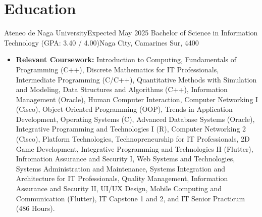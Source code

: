 \section{Education}

\resumeSubHeadingListStart
    \resumeSubheading
    {Ateneo de Naga University}{Expected May 2025}
    {Bachelor of Science in Information Technology (GPA: 3.40 / 4.00)}{Naga City, Camarines Sur, 4400}
    \begin{itemize}
        \item[] \textbf{Relevant Coursework:} Introduction to Computing, Fundamentals of Programming (C++), Discrete Mathematics for IT Professionals, Intermediate Programming (C/C++), Quantitative Methods with Simulation and Modeling, Data Structures and Algorithms (C++), Information Management (Oracle), Human Computer Interaction, Computer Networking I (Cisco), Object-Oriented Programming (OOP), Trends in Application Development, Operating Systems (C), Advanced Database Systems (Oracle), Integrative Programming and Technologies I (R), Computer Networking 2 (Cisco), Platform Technologies, Technopreneurship for IT Professionals, 2D Game Development, Integrative Programming and Technologies II (Flutter), Infromation Assurance and Security I, Web Systems and Technologies, Systems Administration and Maintenance, Systems Integration and Architecture for IT Professionals, Quality Management, Information Assurance and Security II, UI/UX Design, Mobile Computing and Communication (Flutter), IT Capstone 1 and 2, and IT Senior Practicum (486 Hours).
    \end{itemize}
\resumeSubHeadingListEnd